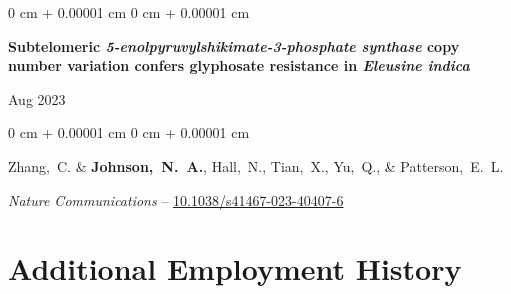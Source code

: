 \documentclass[10pt, letterpaper]{article}
\newenvironment{onecolentry}{
    \begin{adjustwidth}{
        0 cm + 0.00001 cm
    }{
        0 cm + 0.00001 cm
    }
}{
    \end{adjustwidth}
} %
\newenvironment{twocolentry}[2][]{
    \onecolentry
    \def\secondColumn{#2}
    \setcolumnwidth{\fill, 4.5 cm}
    \begin{paracol}{2}
}{
    \switchcolumn \raggedleft \secondColumn
    \end{paracol}
    \endonecolentry
} %
\begin{document}
        \begin{samepage}
            \begin{twocolentry}{
                Aug 2023
            }
                \textbf{Subtelomeric \textit{5-enolpyruvylshikimate-3-phosphate synthase} copy number variation confers glyphosate resistance in \textit{Eleusine indica}}
            \end{twocolentry}

            \vspace{0.10 cm}
            
            \begin{onecolentry}
                \mbox{Zhang, C.} \& \mbox{\textbf{Johnson, N. A.}}, \mbox{Hall, N.}, \mbox{Tian, X.}, \mbox{Yu, Q.}, \& \mbox{Patterson, E. L.}

                \vspace{0.10 cm}
                
                \textit{Nature Communications} -- \href{https://doi.org/10.1038/s41467-023-40407-6}{10.1038/s41467-023-40407-6}
            \end{onecolentry}
        \end{samepage}


        

%
%            
%
%                

        


    \section{Additional Employment History}
\end{document}
